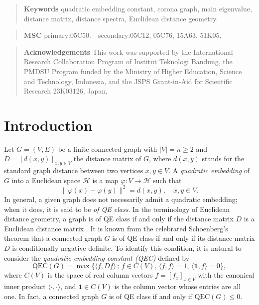 \documentclass[12pt,a4paper]{article}
\newcommand{\1}{{\bm 1}}
\numberwithin{equation}{section}
\begin{document}
\begin{quote}
\textbf{Keywords}\enspace
quadratic embedding constant,
corona graph,
main eigenvalue,
distance matrix,
distance spectra,
Euclidean distance geometry.
\end{quote}

\begin{quote}
\textbf{MSC}\enspace
primary:05C50.  \,\,  secondary:05C12, 05C76, 15A63, 51K05.
\end{quote}

\begin{quote}
{\bfseries Acknowledgements} \enspace 
This work was supported by 
the International Research Collaboration Program of 
Institut Teknologi Bandung, the
PMDSU Program funded by the Ministry of Higher Education, 
Science and Technology, Indonesia,
and the JSPS Grant-in-Aid for Scientific Research 23K03126, Japan,
\end{quote}


\section{Introduction}
\label{01sec:Introduction}

Let $G=(V,E)$ be a finite connected graph with $|V|=n\ge2$
and $D=[d(x,y)]_{x,y\in V}$ the distance matrix of $G$,
where $d(x,y)$ stands for the 
standard graph distance between two vertices $x,y\in V$.
A \textit{quadratic embedding} of $G$ 
into a Euclidean space $\mathcal{H}$ is
a map $\varphi:V\to\mathcal{H}$ such that
\[
\|\varphi(x)-\varphi(y)\|^2=d(x,y), \quad x,y\in V.
\]
In general, a given graph does not
necessarily admit a quadratic embedding;
when it does, it is said to be \textit{of QE class}.
In the terminology of Euclidean distance geometry,
a graph is of QE class if and only if the distance matrix $D$
is a Euclidean distance matrix
\cite{Alfakih2018,Balaji-Bapat2007,Jaklic-Modic2013,
Jaklic-Modic2014, Liberti-Lavor-Maculan-Mucherino2014}.
It is known from the celebrated Schoenberg's theorem 
\cite{Schoenberg1935,Schoenberg1937,Schoenberg1938a,Schoenberg1938b}
that a connected graph $G$ is of QE class
if and only if its distance matrix $D$ is
conditionally negative definite.
To identify this condition, it is natural to consider the 
\textit{quadratic embedding constant (QEC)} defined by
\[
\mathrm{QEC}(G)
=\max\{\langle f,Df \rangle\,;\, f\in C(V), \,
\langle f,f \rangle=1, \, \langle \1,f \rangle=0\},
\]
where $C(V)$ is the space of real column vectors $f=[f_x]_{x\in V}$
with the canonical inner product $\langle\cdot,\cdot\rangle$,
and $\bm{1}\in C(V)$ is the column vector whose entries are all one.
In fact, a connected graph $G$ is of QE class
if and only if $\mathrm{QEC}(G)\le 0$.
\end{document}

